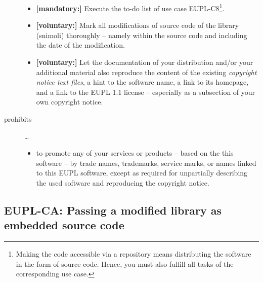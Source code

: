 \begin{description}
\begin{itemize}
  \item \textbf{[mandatory:]} Execute the to-do list of use case EUPL-C8\footnote{
  Making the code accessible via a repository means distributing the software in
  the form of source code. Hence, you must also fulfill all tasks of the
  corresponding use case.}.
    
  \item \textbf{[voluntary:]} Mark all modifications of source code of the
  library (snimoli) thoroughly -- namely within the source code and including
  the date of the modification.
  
  \item \textbf{[voluntary:]} Let the documentation of your distribution and/or
  your additional material  also reproduce the content of the existing
  \emph{copyright notice text files}, a hint to the software name, a link to its
  homepage, and a link to the EUPL 1.1 license -- especially as a subsection of
  your own copyright notice.
  
\end{itemize}

\item[prohibits] \ldots
\begin{itemize}
  \item to promote any of your services or products -- based on the this software
  -- by trade names, trademarks, service marks, or names linked to this EUPL
  software, except as required for unpartially describing the used software and
  reproducing the copyright notice.
\end{itemize}

\end{description}

\subsection{EUPL-CA: Passing a modified library as embedded source code}
\label{OSUC-10S-EUPL}

